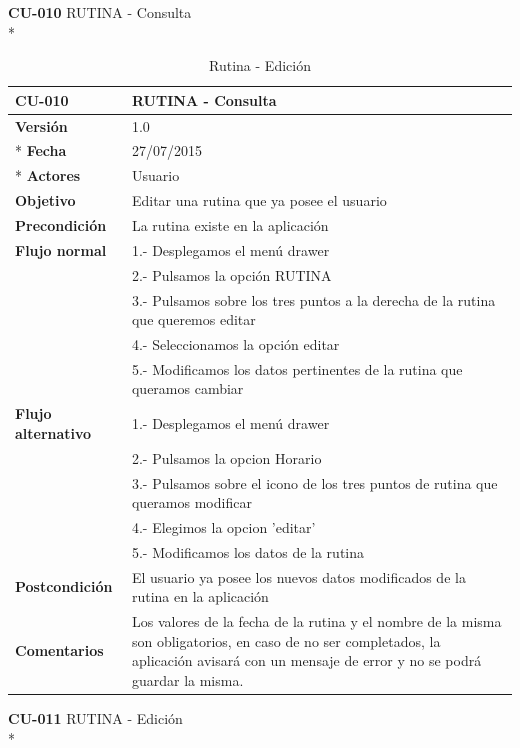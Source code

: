 \documentclass[../pfc.tex]{subfiles}
\begin{document}
	\textbf{CU-010}	RUTINA - Consulta\\*
		
		\begin{table}[H]
			\centering
			\begin{tabular}[t]{|p{3cm}|p{9.5cm}|}
				\hline \textbf{CU-010} & \textbf{RUTINA - Consulta} \\*
				\hline\hline \textbf{Versión} & 1.0 \\ *
				\hline\hline \textbf{Fecha} & 27/07/2015 \\ *
				\hline\textbf{Actores} 	& Usuario\\*
				\hline \textbf{Objetivo} & Editar una rutina que ya posee el usuario\\* 			
				\hline \textbf{Precondición} & La rutina existe en la aplicación\\* 
				\hline \textbf{Flujo normal} & 1.- Desplegamos el menú drawer \\* 
				& 2.- Pulsamos la opción RUTINA\\*	
				& 3.- Pulsamos sobre los tres puntos a la derecha de la rutina que queremos editar\\*	
				& 4.- Seleccionamos la opción editar\\*	
				& 5.- Modificamos los datos pertinentes de la rutina que queramos cambiar\\*	
				\hline \textbf{Flujo alternativo} & 1.- Desplegamos el menú drawer \\* 
				& 2.- Pulsamos la opcion Horario \\*	
				& 3.- Pulsamos sobre el icono de los tres puntos de rutina que queramos modificar \\*	
				& 4.- Elegimos la opcion 'editar'\\*	
				& 5.- Modificamos los datos de la rutina\\*	
				\hline \textbf{Postcondición} & El usuario ya posee los nuevos datos modificados de la rutina en la aplicación \\* 
				\hline \textbf{Comentarios}   & Los valores de la fecha de la rutina y el nombre de la misma son obligatorios, en caso de no ser completados, la aplicación avisará con un mensaje de error y no se podrá guardar la misma.\\*
				\hline
			\end{tabular}
			\caption{Rutina - Edición}
			\label{tabla:caso010}
		\end{table}
		
	\textbf{CU-011}	RUTINA - Edición\\*
		
\end{document}
